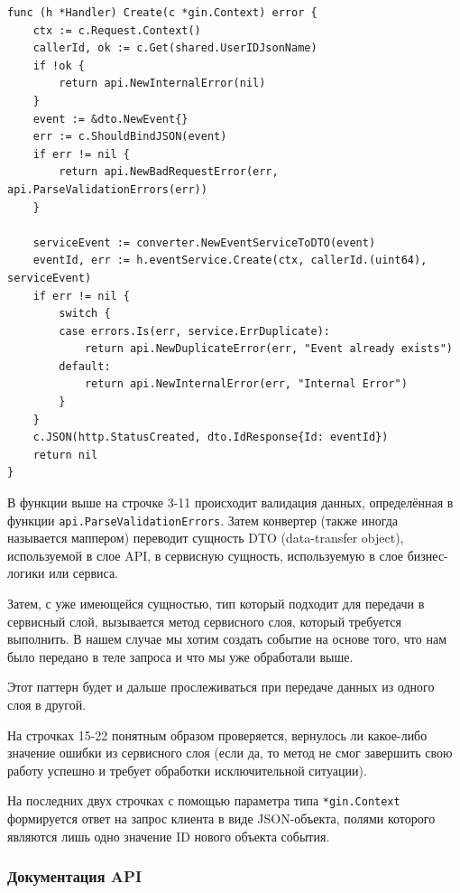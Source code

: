 \documentclass[diploma]{SCWorks}
\begin{document}
\begin{verbatim}
func (h *Handler) Create(c *gin.Context) error {
    ctx := c.Request.Context()
    callerId, ok := c.Get(shared.UserIDJsonName)
    if !ok {
        return api.NewInternalError(nil)
    }
    event := &dto.NewEvent{}
    err := c.ShouldBindJSON(event)
    if err != nil {
        return api.NewBadRequestError(err, api.ParseValidationErrors(err))
    }

    serviceEvent := converter.NewEventServiceToDTO(event)
    eventId, err := h.eventService.Create(ctx, callerId.(uint64), serviceEvent)
    if err != nil {
        switch {
        case errors.Is(err, service.ErrDuplicate):
            return api.NewDuplicateError(err, "Event already exists")
        default:
            return api.NewInternalError(err, "Internal Error")
        }
    }
    c.JSON(http.StatusCreated, dto.IdResponse{Id: eventId})
    return nil
}
\end{verbatim}

В функции выше на строчке 3-11 происходит валидация данных, определённая в 
функции \texttt{api.ParseValidationErrors}. Затем конвертер (также иногда
называется маппером) переводит сущность DTO (data-transfer object), используемой
в слое API, в сервисную сущность, используемую в слое бизнес-логики или сервиса.

Затем, с уже имеющейся сущностью, тип который подходит для передачи в сервисный
слой, вызывается метод сервисного слоя, который требуется выполнить. В нашем
случае мы хотим создать событие на основе того, что нам было передано в 
теле запроса и что мы уже обработали выше.

Этот паттерн будет и дальше прослеживаться при передаче данных из одного слоя 
в другой.

На строчках 15-22 понятным образом проверяется, вернулось ли какое-либо
значение ошибки из сервисного слоя (если да, то метод не смог завершить свою 
работу успешно и требует обработки исключительной ситуации).

На последних двух строчках с помощью параметра типа \texttt{*gin.Context} 
формируется ответ на запрос клиента в виде JSON-объекта, полями которого 
являются лишь одно значение ID нового объекта события.

\subsubsection{Документация API}
\end{document}
